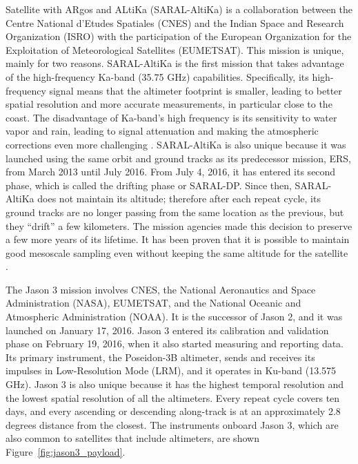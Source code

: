Satellite with ARgos and ALtiKa (SARAL-AltiKa) is a collaboration between the Centre National d'Etudes Spatiales (CNES) and the Indian Space and Research Organization (ISRO) \cite{Verron2015} with the participation of the European Organization for the Exploitation of Meteorological Satellites (EUMETSAT). This mission is unique, mainly for two reasons. SARAL-AltiKa is the first mission that takes advantage of the high-frequency Ka-band (35.75 GHz) capabilities. Specifically, its high-frequency signal means that the altimeter footprint is smaller, leading to better spatial resolution and more accurate measurements, in particular close to the coast. The disadvantage of Ka-band's high frequency is its sensitivity to water vapor and rain, leading to signal attenuation and making the atmospheric corrections even more challenging \cite{Bonnefond2018, Tournadre2009}. SARAL-AltiKa is also unique because it was launched using the same orbit and ground tracks as its predecessor mission, ERS, from March 2013 until July 2016. From July 4, 2016, it has entered its second phase, which is called the drifting phase or SARAL-DP. Since then, SARAL-AltiKa does not maintain its altitude; therefore after each repeat cycle, its ground tracks are no longer passing from the same location as the previous, but they \enquote{drift} a few kilometers. The mission agencies made this decision to preserve a few more years of its lifetime. It has been proven that it is possible to maintain good mesoscale sampling even without keeping the same altitude for the satellite \cite{Dibarboure2018}.


The Jason 3 mission involves CNES, the National Aeronautics and Space Administration (NASA), EUMETSAT, and the National Oceanic and Atmospheric Administration (NOAA). It is the successor of Jason 2, and it was launched on January 17, 2016. Jason 3 entered its calibration and validation phase on February 19, 2016, when it also started measuring and reporting data. Its primary instrument, the Poseidon-3B altimeter, sends and receives its impulses in Low-Resolution Mode (LRM), and it operates in Ku-band (13.575 GHz). Jason 3 is also unique because it has the highest temporal resolution and the lowest spatial resolution of all the altimeters. Every repeat cycle covers ten days, and every ascending or descending along-track is at an approximately 2.8 degrees distance from the closest. The instruments onboard Jason 3, which are also common to satellites that include altimeters, are shown  Figure~\ref{fig:jason3_payload}.

